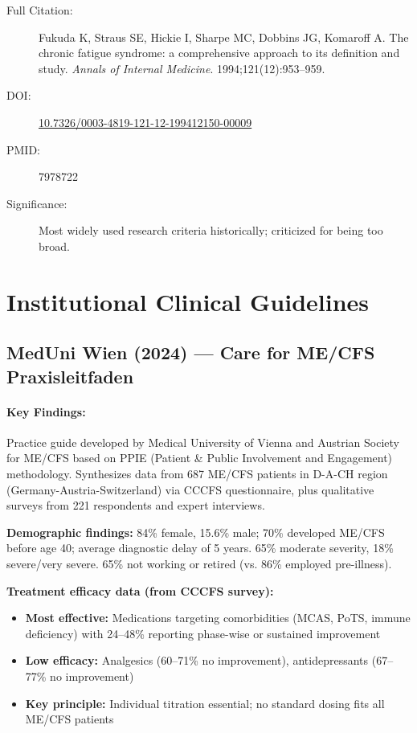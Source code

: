 \begin{description}
    \item[Full Citation:] Fukuda K, Straus SE, Hickie I, Sharpe MC, Dobbins JG, Komaroff A. The chronic fatigue syndrome: a comprehensive approach to its definition and study. \textit{Annals of Internal Medicine}. 1994;121(12):953--959.
    \item[DOI:] \href{https://doi.org/10.7326/0003-4819-121-12-199412150-00009}{10.7326/0003-4819-121-12-199412150-00009}
    \item[PMID:] 7978722
    \item[Significance:] Most widely used research criteria historically; criticized for being too broad.
\end{description}

\section{Institutional Clinical Guidelines}
\label{sec:bib-institutional-guidelines}

\subsection{MedUni Wien (2024) --- Care for ME/CFS Praxisleitfaden}


\paragraph{Key Findings:}
Practice guide developed by Medical University of Vienna and Austrian Society for ME/CFS based on PPIE (Patient \& Public Involvement and Engagement) methodology. Synthesizes data from 687 ME/CFS patients in D-A-CH region (Germany-Austria-Switzerland) via CCCFS questionnaire, plus qualitative surveys from 221 respondents and expert interviews.

\textbf{Demographic findings:} 84\% female, 15.6\% male; 70\% developed ME/CFS before age 40; average diagnostic delay of 5 years. 65\% moderate severity, 18\% severe/very severe. 65\% not working or retired (vs. 86\% employed pre-illness).

\textbf{Treatment efficacy data (from CCCFS survey):}
\begin{itemize}
    \item \textbf{Most effective:} Medications targeting comorbidities (MCAS, PoTS, immune deficiency) with 24--48\% reporting phase-wise or sustained improvement
    \item \textbf{Low efficacy:} Analgesics (60--71\% no improvement), antidepressants (67--77\% no improvement)
    \item \textbf{Key principle:} Individual titration essential; no standard dosing fits all ME/CFS patients
\end{itemize}

